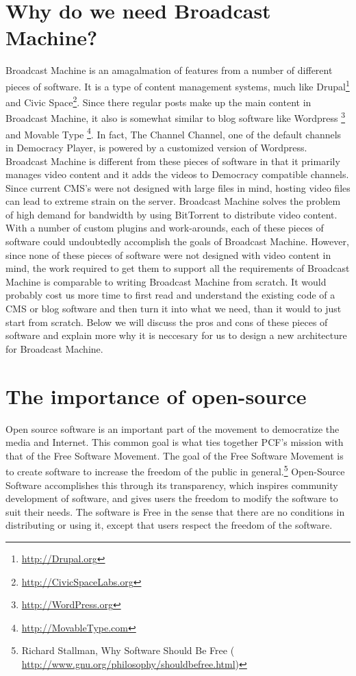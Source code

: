 \documentclass[a4paper,12pt]{report}
\begin{document}
\section {Why do we need Broadcast Machine?}
    Broadcast Machine is an amagalmation of features from a number of different pieces of software.
It is a type of content management systems, much like Drupal\footnote{\url{http://Drupal.org}} and Civic Space\footnote{\url{http://CivicSpaceLabs.org} }.
Since there regular posts make up the main content in Broadcast Machine, it also is somewhat similar to blog software like Wordpress \footnote{\url{http://WordPress.org}} and Movable Type \footnote{\url{ http://MovableType.com}}.
In fact, The Channel Channel, one of the default channels in Democracy Player, is powered by a customized version of Wordpress.
Broadcast Machine is different from these pieces of software in that it primarily manages video content and it adds the videos to Democracy compatible channels.
Since current CMS's were not designed with large files in mind, hosting video files can lead to extreme strain on the server.
Broadcast Machine solves the problem of high demand for bandwidth by using BitTorrent to distribute video content.
With a number of custom plugins and work-arounds, each of these pieces of software could undoubtedly accomplish the goals of Broadcast Machine.
However, since none of these pieces of software were not designed with video content in mind, the work required to get them to support all the requirements of Broadcast Machine is comparable to writing Broadcast Machine from scratch.
It would probably cost us more time to first read and understand the existing code of a CMS or blog software and then turn it into what we need, than it would to just start from scratch.
Below we will discuss the pros and cons of these pieces of software and explain more why it is neccesary for us to design a new architecture for Broadcast Machine.
	
\section {The importance of open-source}
    Open source software is an important part of the movement to democratize the media and Internet.
This common goal is what ties together PCF's mission with that of the Free Software Movement.
The goal of the Free Software Movement is to create software to increase the freedom of the public in general.\footnote{Richard Stallman, Why Software Should Be Free (\url{ http://www.gnu.org/philosophy/shouldbefree.html})}
Open-Source Software accomplishes this through its transparency, which inspires community development of software, and gives users the freedom to modify the software to suit their needs.
The software is Free in the sense that there are no conditions in distributing or using it, except that users respect the freedom of the software.
\end{document}
